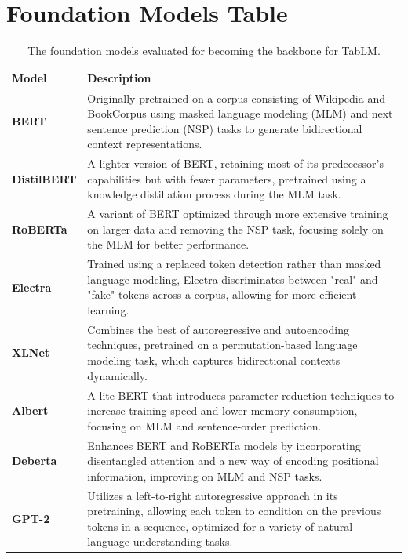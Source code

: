 \documentclass{article}
\theoremstyle{plain}
\theoremstyle{definition}
\theoremstyle{remark}
\begin{document}
\section{Foundation Models Table}
\label{FMT}
\begin{table}[H]
\centering
\caption{The foundation models evaluated for becoming the backbone for TabLM.}
\begin{tabular}{p{6cm}p{8cm}}
\toprule
\textbf{Model} & \textbf{Description} \\
\midrule
\textbf{BERT} \cite{devlin2018bert} & Originally pretrained on a corpus consisting of Wikipedia and BookCorpus using masked language modeling (MLM) and next sentence prediction (NSP) tasks to generate bidirectional context representations.\\
\midrule
\textbf{DistilBERT} \cite{sanh2019distilbert} & A lighter version of BERT, retaining most of its predecessor's capabilities but with fewer parameters, pretrained using a knowledge distillation process during the MLM task.\\
\midrule
\textbf{RoBERTa} \cite{liu2019roberta} & A variant of BERT optimized through more extensive training on larger data and removing the NSP task, focusing solely on the MLM for better performance.\\
\midrule
\textbf{Electra} \cite{clark2020electra} & Trained using a replaced token detection rather than masked language modeling, Electra discriminates between "real" and "fake" tokens across a corpus, allowing for more efficient learning.\\
\midrule
\textbf{XLNet} \cite{yang2019xlnet}& Combines the best of autoregressive and autoencoding techniques, pretrained on a permutation-based language modeling task, which captures bidirectional contexts dynamically.\\
\midrule
\textbf{Albert} \cite{lan2019albert} & A lite BERT that introduces parameter-reduction techniques to increase training speed and lower memory consumption, focusing on MLM and sentence-order prediction.\\
\midrule
\textbf{Deberta} \cite{he2020deberta} & Enhances BERT and RoBERTa models by incorporating disentangled attention and a new way of encoding positional information, improving on MLM and NSP tasks.\\
\midrule
\textbf{GPT-2} \cite{radford2019language} & Utilizes a left-to-right autoregressive approach in its pretraining, allowing each token to condition on the previous tokens in a sequence, optimized for a variety of natural language understanding tasks.\\

\end{tabular}
\end{table}
\end{document}
